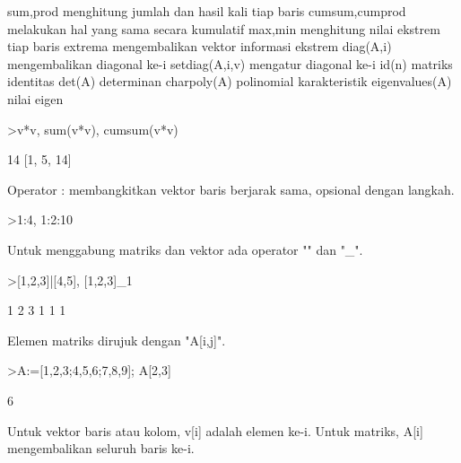 \documentclass[a4paper,10pt]{article}
\begin{document}
\begin{eulernotebook}
\begin{eulercomment}
\begin{eulercomment}
\begin{eulercomment}
\begin{eulercomment}
\begin{eulercomment}
\begin{eulercomment}
\begin{eulercomment}
\begin{eulercomment}
\begin{eulercomment}
\begin{eulercomment}
\begin{eulercomment}
\begin{eulercomment}
\begin{eulercomment}
\begin{eulercomment}
\begin{eulercomment}
\begin{eulercomment}
\begin{eulercomment}
\end{eulercomment}
\begin{eulerttcomment}
  sum,prod menghitung jumlah dan hasil kali tiap baris
  cumsum,cumprod melakukan hal yang sama secara kumulatif
  max,min menghitung nilai ekstrem tiap baris
  extrema mengembalikan vektor informasi ekstrem
  diag(A,i) mengembalikan diagonal ke-i
  setdiag(A,i,v) mengatur diagonal ke-i
  id(n) matriks identitas
  det(A) determinan
  charpoly(A) polinomial karakteristik
  eigenvalues(A) nilai eigen
\end{eulerttcomment}
\begin{eulerprompt}
>v*v, sum(v*v), cumsum(v*v)
\end{eulerprompt}
\begin{euleroutput}
  [1,  4,  9]
  14
  [1,  5,  14]
\end{euleroutput}
\begin{eulercomment}
Operator : membangkitkan vektor baris berjarak sama, opsional dengan langkah.
\end{eulercomment}
\begin{eulerprompt}
>1:4, 1:2:10
\end{eulerprompt}
\begin{euleroutput}
  [1,  2,  3,  4]
  [1,  3,  5,  7,  9]
\end{euleroutput}
\begin{eulercomment}
Untuk menggabung matriks dan vektor ada operator "\textbar{}" dan "\_".
\end{eulercomment}
\begin{eulerprompt}
>[1,2,3]|[4,5], [1,2,3]_1
\end{eulerprompt}
\begin{euleroutput}
  [1,  2,  3,  4,  5]
              1             2             3 
              1             1             1 
\end{euleroutput}
\begin{eulercomment}
Elemen matriks dirujuk dengan "A[i,j]".
\end{eulercomment}
\begin{eulerprompt}
>A:=[1,2,3;4,5,6;7,8,9]; A[2,3]
\end{eulerprompt}
\begin{euleroutput}
  6
\end{euleroutput}
\begin{eulercomment}
Untuk vektor baris atau kolom, v[i] adalah elemen ke-i. Untuk matriks,
A[i] mengembalikan seluruh baris ke-i.
\end{eulercomment}
\begin{eulerprompt}

\end{eulerprompt}
\end{eulercomment}
\end{eulercomment}
\end{eulercomment}
\end{eulercomment}
\end{eulercomment}
\end{eulercomment}
\end{eulercomment}
\end{eulercomment}
\end{eulercomment}
\end{eulercomment}
\end{eulercomment}
\end{eulercomment}
\end{eulercomment}
\end{eulercomment}
\end{eulercomment}
\end{eulercomment}
\end{eulernotebook}
\end{document}

